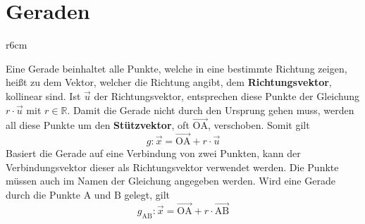 \documentclass{article}
\begin{document}
 
\newcommand{\vect}[1]{\overrightarrow{#1}} 
  
\section{Geraden} 
\begin{wrapfigure}{r}{6cm}
  \centering
\end{wrapfigure} 
Eine Gerade beinhaltet alle Punkte, welche in eine bestimmte Richtung zeigen, heißt zu dem Vektor, welcher die Richtung angibt, dem \textbf{Richtungsvektor}, kollinear sind. Ist $\vect{u}$ der Richtungsvektor, entsprechen diese Punkte der Gleichung $r \cdot \vect{u}$ mit $r \in \mathbb{R}$. Damit die Gerade nicht durch den Ursprung gehen muss, werden all diese Punkte um den \textbf{Stützvektor}, oft $\vect{\mathrm{OA}}$, verschoben.
Somit gilt 
\[
 g: \vect{x} = \vect{\mathrm{OA}} + r \cdot \vect{u} 
\] 
Basiert die Gerade auf eine Verbindung von zwei Punkten, kann der Verbindungsvektor dieser als Richtungsvektor verwendet werden. Die Punkte müssen auch im Namen der Gleichung angegeben werden. Wird eine Gerade durch die Punkte $\mathrm{A}$ und $\mathrm{B}$ gelegt, gilt 
\[
 g_{\mathrm{AB}}: \vect{x} = \vect{\mathrm{OA}} + r \cdot \vect{\mathrm{AB}} 
\]
 
\end{document}

